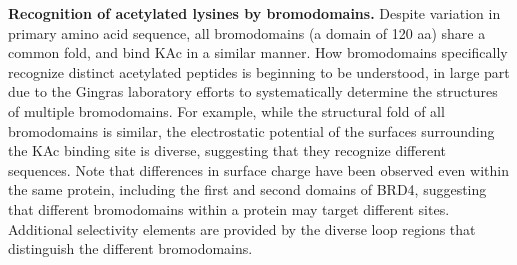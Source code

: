 \documentclass[arial,11pt]{article}
\begin{document}
{\bf Recognition of acetylated lysines by bromodomains.} Despite variation in primary amino acid sequence, all bromodomains (a domain of 120 aa) share a common fold, and bind KAc in a similar manner.
How bromodomains specifically recognize distinct acetylated peptides is beginning to be understood, in large part due to the Gingras laboratory efforts to systematically determine the structures of multiple bromodomains. For example, while the structural fold of all bromodomains is similar, the electrostatic potential of the surfaces surrounding the KAc binding site is diverse, suggesting that they recognize different sequences.
 Note that differences in surface charge have been observed even within the same protein, including the first and second domains of BRD4, suggesting that different bromodomains within a protein may target different sites.
Additional selectivity elements are provided by the diverse loop regions that distinguish the different bromodomains.
\end{document}
